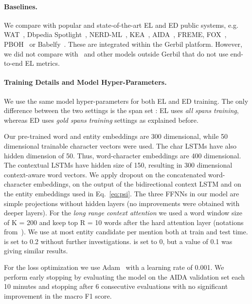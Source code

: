 \documentclass[11pt,a4paper]{article}
\begin{document}
\paragraph{Baselines.}
We compare with popular and state-of-the-art EL and ED public systems, e.g. WAT~\citep{piccinno2014tagme}, Dbpedia Spotlight~\citep{mendes2011dbpedia}, NERD-ML~\citep{van2013learning}, KEA~\citep{steinmetz2013semantic}, AIDA~\citep{hoffart2011robust}, FREME, FOX~\citep{speck2014ensemble}, PBOH~\citep{ganea2016probabilistic} or Babelfy~\citep{moro2014entity}. These are integrated within the Gerbil platform. However, we did not compare with~\citep{luo2015joint} and other models outside Gerbil that do not use end-to-end EL metrics.


\paragraph{Training Details and Model Hyper-Parameters.} We use the same model hyper-parameters for both EL and ED training. The only difference between the two settings is the span set  : EL uses \textit{all spans training}, whereas ED uses \textit{gold spans training} settings as explained before.

Our pre-trained word and entity embeddings are 300 dimensional, while 50 dimensional trainable character vectors were used. The char LSTMs have also hidden dimension of 50. Thus, word-character embeddings are 400 dimensional. The contextual LSTMs have hidden size of 150, resulting in 300 dimensional context-aware word vectors. We apply dropout on the concatenated word-character embeddings, on the output of the bidirectional context LSTM and on the entity embeddings used in Eq.~\ref{eq:psi}. The three FFNNs in our model are simple projections without hidden layers (no improvements were obtained with deeper layers). For the \textit{long range context attention} we used a word window size of K = 200 and keep top R = 10 words after the hard attention layer (notations from~\citep{ganea2017deep}). We use at most  entity candidate per mention both at train and test time.  is set to 0.2 without further investigations.  is set to 0, but a value of 0.1 was giving similar results.

For the loss optimization we use Adam~\citep{kingma2014adam} with a learning rate of 0.001. We perform early stopping by evaluating the model on the AIDA validation set each 10 minutes and stopping after 6 consecutive evaluations with no significant improvement in the macro F1 score. 
\end{document}
